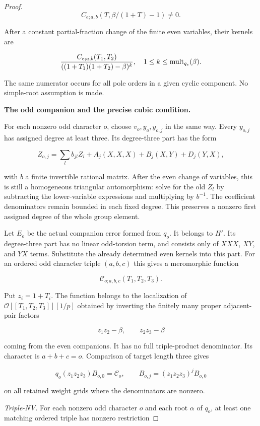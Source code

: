\begin{proof}
\[
C_{e;a,b}(T,\beta/(1+T)-1)\ne0.
\]

After a constant partial-fraction change of the finite even variables, their kernels are

\[
\frac{C_{e;a,b}(T_1,T_2)}
 {((1+T_1)(1+T_2)-\beta)^k},
\quad 1\le k\le {\rm mult}_{q_e}(\beta).
\]

The same numerator occurs for all pole orders in a given cyclic component. No simple-root assumption is made.

\par\medskip\noindent\textbf{The odd companion and the precise cubic condition.}

For each nonzero odd character \(o\), choose \(v_o,y_o,y_{o,j}\) in the same way. Every \(y_{o,j}\) has assigned degree at least three. Its degree-three part has the form

\[
Z_{o,j}=\sum_l b_{jl}Z_l+
  A_j(X,X,X)+B_j(X,Y)+D_j(Y,X),
\]

with \(b\) a finite invertible rational matrix. After the even change of variables, this is still a homogeneous triangular automorphism: solve for the old \(Z_l\) by subtracting the lower-variable expressions and multiplying by \(b^{-1}\). The coefficient denominators remain bounded in each fixed degree. This preserves a nonzero first assigned degree of the whole group element.

Let \(E_o\) be the actual companion error formed from \(q_o\). It belongs to \(H'\). Its degree-three part has no linear odd-torsion term, and consists only of \(XXX\), \(XY\), and \(YX\) terms. Substitute the already determined even kernels into this part. For an ordered odd character triple \((a,b,c)\) this gives a meromorphic function

\[
\mathcal C_{o;a,b,c}(T_1,T_2,T_3).
\]

Put \(z_i=1+T_i\). The function belongs to the localization of
\(\mathcal O[[T_1,T_2,T_3]][1/p]\) obtained by inverting the finitely many proper adjacent-pair factors

\[
z_1z_2-\beta,\qquad z_2z_3-\beta
\]

coming from the even companions. It has no full triple-product denominator. Its character is \(a+b+c=o\). Comparison of target length three gives

\[
q_o(z_1z_2z_3)B_{o,0}=\mathcal C_o,\qquad
B_{o,j}=(z_1z_2z_3)^jB_{o,0}
\]

on all retained weight grids where the denominators are nonzero.

\emph{Triple-NV.} For each nonzero odd character \(o\) and each root \(\alpha\) of \(q_o\), at least one matching ordered triple has nonzero restriction


\end{proof}
